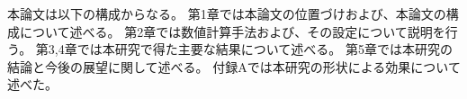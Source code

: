 \documentclass[/Users/ikedahajime/GitHub/reserch/master_report/thesis]{subfiles}
\begin{document}
本論文は以下の構成からなる。
第1章では本論文の位置づけおよび、本論文の構成について述べる。
第2章では数値計算手法および、その設定について説明を行う。
第3,4章では本研究で得た主要な結果について述べる。
第5章では本研究の結論と今後の展望に関して述べる。
付録Aでは本研究の形状による効果について述べた。
\end{document}
